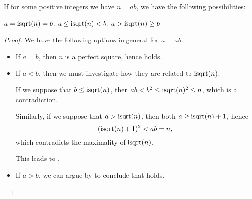 \begin{proposition}\label{thm:int_sqrt_leq}
  If for some positive integers we have \( n = ab \), we have the following possibilities:
  \begin{thmenum}
     \( a = \op{isqrt}(n) = b \).
     \( a \leq \op{isqrt}(n) < b \).
     \( a > \op{isqrt}(n) \geq b \).
  \end{thmenum}
\end{proposition}
\begin{proof}
  We have the following options in general for \( n = ab \):
  \begin{itemize}
    \item If \( a = b \), then \( n \) is a perfect square, hence  holds.
    \item If \( a < b \), then we must investigate how they are related to \( \op{isqrt}(n) \).

    If we suppose that \( b \leq \op{isqrt}(n) \), then \( ab < b^2 \leq \op{isqrt}(n)^2 \leq n \), which is a contradiction.

    Similarly, if we suppose that \( a > \op{isqrt}(n) \), then both \( a \geq \op{isqrt}(n) + 1 \), hence
    \begin{equation*}
      (\op{isqrt}(n) + 1)^2 < ab = n,
    \end{equation*}
    which contradicts the maximality of \( \op{isqrt}(n) \).

    This leads to .

    \item If \( a > b \), we can argue by  to conclude that  holds.
  \end{itemize}
\end{proof}

